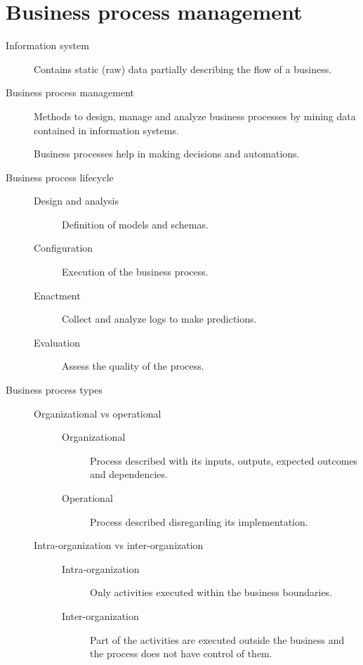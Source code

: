 \chapter{Business process management}

\begin{description}
    \item[Information system] 
        Contains static (raw) data partially describing the flow of a business.

    \item[Business process management] 
        Methods to design, manage and analyze business processes by mining data contained in information systems.

        Business processes help in making decisions and automations.

    \item[Business process lifecycle] \phantom{}
        \begin{description}
            \item[Design and analysis]
                Definition of models and schemas.
            \item[Configuration]
                Execution of the business process.
            \item[Enactment]
                Collect and analyze logs to make predictions.
            \item[Evaluation]
                Assess the quality of the process.
        \end{description}

    \item[Business process types] \phantom{}
        \begin{description}
            \item[Organizational vs operational] \phantom{} 
                \begin{description}
                    \item[Organizational]
                        Process described with its inputs, outputs, expected outcomes and dependencies.
                    \item[Operational]
                        Process described disregarding its implementation.
                \end{description}

            \item[Intra-organization vs inter-organization] \phantom{}
                \begin{description}
                    \item[Intra-organization]
                        Only activities executed within the business boundaries.
                    \item[Inter-organization]
                        Part of the activities are executed outside the business and the process does not have control of them.
                \end{description}


\end{description}
\end{description}
